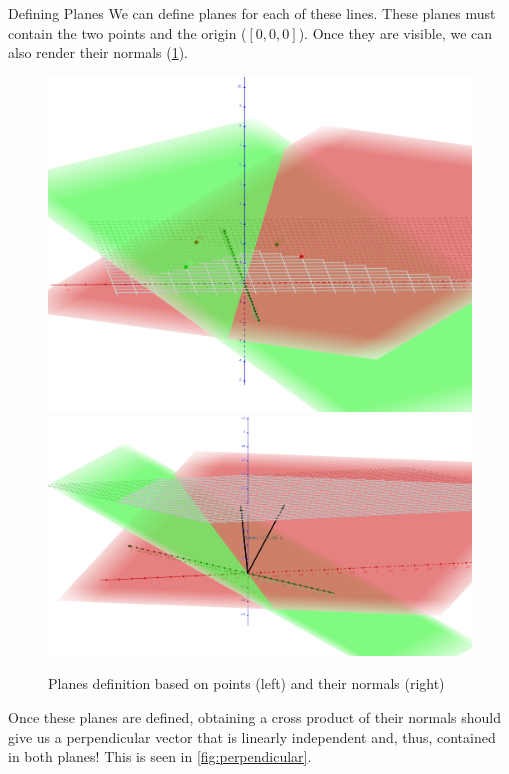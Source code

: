 \documentclass[twocolumn]{article}
\begin{document}
    \begin{section}{Defining Planes}
      \label{sec:planes}
      We can define planes for each of these lines. These planes must contain
the two points and the origin ($[0, 0, 0]$). Once they are visible, we can also
render their normals (\cref{fig:planes}).

      \begin{figure}
        \centering
        \includegraphics[width=0.49\linewidth]{./res/4.png}
        \includegraphics[width=0.49\linewidth]{./res/5.png}
        \caption{Planes definition based on points (left) and their normals
(right)}
        \label{fig:planes}
      \end{figure}

      Once these planes are defined, obtaining a cross product of their normals
should give us a perpendicular vector that is linearly independent and, thus,
contained in both planes! This is seen in \cref{fig:perpendicular}.


\end{section}
\end{document}
